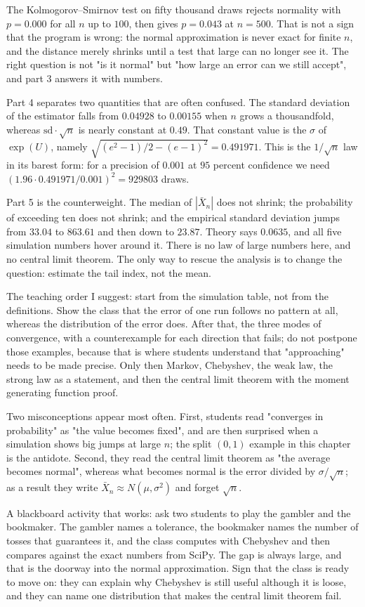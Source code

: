 The Kolmogorov--Smirnov test on fifty thousand draws rejects normality with
$p=0.000$ for all $n$ up to $100$, then gives $p=0.043$ at $n=500$. That is not a
sign that the program is wrong: the normal approximation is never exact for finite
$n$, and the distance merely shrinks until a test that large can no longer see it.
The right question is not "is it normal" but "how large an error can we still
accept", and part 3 answers it with numbers.

Part 4 separates two quantities that are often confused. The standard deviation of
the estimator falls from $0.04928$ to $0.00155$ when $n$ grows a thousandfold,
whereas $\text{sd}\cdot\sqrt n$ is nearly constant at $0.49$. That constant value
is the $\sigma$ of $\exp(U)$, namely $\sqrt{(e^2-1)/2-(e-1)^2}=0.491971$. This is
the $1/\sqrt n$ law in its barest form: for a precision of $0.001$ at $95$ percent
confidence we need $(1.96\cdot0.491971/0.001)^2=929803$ draws.

Part 5 is the counterweight. The median of $|\bar X_n|$ does not shrink; the
probability of exceeding ten does not shrink; and the empirical standard deviation
jumps from $33.04$ to $863.61$ and then down to $23.87$. Theory says
$0.0635$, and all five simulation numbers hover around it. There is no law of large
numbers here, and no central limit theorem. The only way to rescue the analysis is to
change the question: estimate the tail index, not the mean.

\begin{untukdosen}
The teaching order I suggest: start from the simulation table, not from the
definitions. Show the class that the error of one run follows no pattern at all,
whereas the distribution of the error does. After that, the three modes of
convergence, with a counterexample for each direction that fails; do not postpone
those examples, because that is where students understand that "approaching" needs to
be made precise. Only then Markov, Chebyshev, the weak law, the strong law as a
statement, and then the central limit theorem with the moment generating function
proof.

Two misconceptions appear most often. First, students read "converges in
probability" as "the value becomes fixed", and are then surprised when a simulation
shows big jumps at large $n$; the split $(0,1)$ example in this chapter is the
antidote. Second, they read the central limit theorem as "the average becomes
normal", whereas what becomes normal is the error divided by $\sigma/\sqrt n$; as a
result they write $\bar X_n\approx N(\mu,\sigma^2)$ and forget $\sqrt n$.

A blackboard activity that works: ask two students to play the gambler and the
bookmaker. The gambler names a tolerance, the bookmaker names the number of tosses
that guarantees it, and the class computes with Chebyshev and then compares against
the exact numbers from SciPy. The gap is always large, and that is the doorway into
the normal approximation. Sign that the class is ready to move on: they can explain
why Chebyshev is still useful although it is loose, and they can name one
distribution that makes the central limit theorem fail.
\end{untukdosen}

